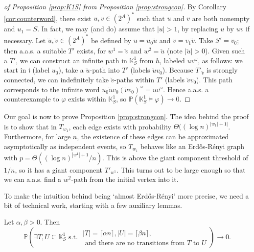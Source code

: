 \documentclass[runngingheads]{llncs}
\newcommand{\ini}{\mathfrak{i}}
\begin{document}
\begin{proof}[of Proposition \ref{prop:K1S} from Proposition \ref{prop:strongcon}] By Corollary \ref{cor:counterword}, there exist $u,v \in (2^A)^*$ such that $u$ and $v$ are both nonempty and $u_1 = S$. In fact, we may (and do) assume that $|u| > 1$, by replacing $u$ by $uv$ if necessary. Let $\breve{u},\breve{v} \in (2^A)^*$ be defined by $u = u_0\breve{u}$ and $v = v_1\breve{v}$. Take $S' = v_0$; then a.a.s. a suitable $T'$ exists, for $w^1 = \breve{v}$ and $w^2 = \breve{u}$ (note $|\breve{u}| >0$). Given such a $T'$, we can construct an infinite path in $\mathbb{K}^1_S$ from $h$, labeled $uv^{\omega}$, as follows: we start in $\ini$ (label $u_0$), take a $\breve{u}$-path into $T'$ (labels $\breve{u}v_0$). Because $T'_{\breve{v}}$ is strongly connected, we can indefinitely take $\breve{v}$-paths within $T'$ (labels $\breve{v}v_0$). This path corresponds to the infinite word $u_0\breve{u}v_0(\breve{v}v_0)^{\omega} = uv^{\omega}$. Hence a.a.s. a counterexample to $\varphi$ exists within $\mathbb{K}^1_S$, so $\mathbb{P}(\mathbb{K}^1_S \models \varphi) \rightarrow 0$.
\end{proof}

Our goal is now to prove Proposition \ref{prop:strongcon}. The idea behind the proof is to show that in $T_{w_1}$, each edge exists with probability $\Theta((\log n)^{|w_1|+1|}$. Furthermore, for large $n$, the existence of these edges can be approximated asymptotically as independent events, so $T_{w_1}$ behaves like an Erd\H{o}s-Rényi graph with $p = \Theta((\log n)^{|w^1|+1}/n)$. This is above the giant component threshold of $1/n$, so it has a giant component $T'_{w^1}$. This turns out to be large enough so that we can a.a.s. find a $w^2$-path from the initial vertex into it.

To make the intuition behind being `almost Erd\H{o}s-Rényi' more precise, we need a bit of technical work, starting with a few auxiliary lemmas.

\begin{lemma} \label{lem:noedges}
Let $\alpha,\beta > 0$. Then
\[
\mathbb{P}\left(\exists T,U \subseteq \mathbb{K}^1_S \textrm{ s.t. } \substack{ |T| = \lceil \alpha n\rceil, |U| = \lceil \beta n \rceil,\\\textrm{ and there are no transitions from $T$ to $U$}}\right) \rightarrow 0.
\]
\end{lemma}
\end{document}
